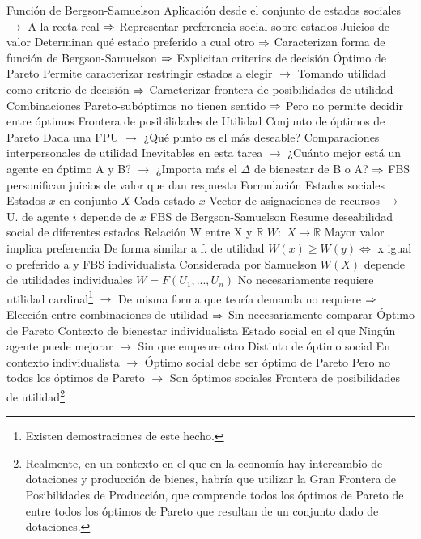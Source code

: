 \documentclass{nuevotema}
\begin{document}
\begin{esquemal}
				\4 Función de Bergson-Samuelson
				\4[] Aplicación desde el conjunto de estados sociales
				\4[] $\to$ A la recta real
				\4[] $\then$ Representar preferencia social sobre estados
				\4 Juicios de valor
				\4[] Determinan qué estado preferido a cual otro
				\4[] $\then$ Caracterizan forma de función de Bergson-Samuelson
				\4[] $\then$ Explicitan criterios de decisión
				\4 Óptimo de Pareto
				\4[] Permite caracterizar restringir estados a elegir
				\4[] $\to$ Tomando utilidad como criterio de decisión
				\4[] $\then$ Caracterizar frontera de posibilidades de utilidad
				\4[] Combinaciones Pareto-subóptimos no tienen sentido
				\4[] $\then$ Pero no permite decidir entre óptimos
				\4 Frontera de posibilidades de Utilidad
				\4[] Conjunto de óptimos de Pareto
				\4[] Dada una FPU
				\4[] $\to$ ¿Qué punto es el más deseable?
				\4 Comparaciones interpersonales de utilidad
				\4[] Inevitables en esta tarea
				\4[] $\to$ ¿Cuánto mejor está un agente en óptimo A y B?
				\4[] $\to$ ¿Importa más el $\Delta$ de bienestar de B o A?
				\4[] $\then$ FBS personifican juicios de valor que dan respuesta
		\2 Formulación
			\3 Estados sociales
				\4 Estados $x$ en conjunto $X$
				\4 Cada estado $x$
				\4[] Vector de asignaciones de recursos
				\4[] $\to$ U. de agente $i$ depende de $x$
			\3 FBS de Bergson-Samuelson
				\4 Resume deseabilidad social de diferentes estados
				\4 Relación W entre X y $\mathbb{R}$
				\4[] $W: \, \, X \to \mathbb{R}$
				\4 Mayor valor implica preferencia
				\4[] De forma similar a f. de utilidad
				\4[] $W(x) \geq W(y) \iff$ x igual o preferido a y
				\4 FBS individualista
				\4[] Considerada por Samuelson
				\4[] $W(X)$ depende de utilidades individuales
				\4[$\then$] $W = F(U_1, ..., U_n)$
				\4[] No necesariamente requiere utilidad cardinal\footnote{Existen demostraciones de este hecho.}
				\4[] $\to$ De misma forma que teoría demanda no requiere
				\4[] $\then$ Elección entre combinaciones de utilidad
				\4[] $\then$ Sin necesariamente comparar
			\3 Óptimo de Pareto
				\4 Contexto de bienestar individualista
				\4 Estado social en el que
				\4[] Ningún agente puede mejorar
				\4[] $\to$ Sin que empeore otro
				\4 Distinto de óptimo social
				\4[] En contexto individualista
				\4[] $\to$ Óptimo social debe ser óptimo de Pareto
				\4[] Pero no todos los óptimos de Pareto
				\4[] $\to$ Son óptimos sociales
			\3 Frontera de posibilidades de utilidad\footnote{Realmente, en un contexto en el que en la economía hay intercambio de dotaciones y producción de bienes, habría que utilizar la Gran Frontera de Posibilidades de Producción, que comprende todos los óptimos de Pareto de entre todos los óptimos de Pareto que resultan de un conjunto dado de dotaciones.}

\end{esquemal}
\end{document}

